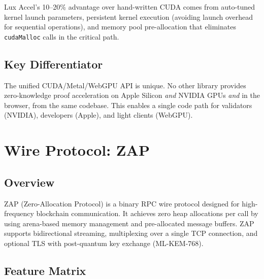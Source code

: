 \documentclass[11pt,twocolumn]{article}
\begin{document}
Lux Accel's 10--20\% advantage over hand-written CUDA comes from auto-tuned kernel launch parameters, persistent kernel execution (avoiding launch overhead for sequential operations), and memory pool pre-allocation that eliminates \texttt{cudaMalloc} calls in the critical path.

\subsection{Key Differentiator}

The unified CUDA/Metal/WebGPU API is unique. No other library provides zero-knowledge proof acceleration on Apple Silicon \textit{and} NVIDIA GPUs \textit{and} in the browser, from the same codebase. This enables a single code path for validators (NVIDIA), developers (Apple), and light clients (WebGPU).

\section{Wire Protocol: ZAP}
\label{sec:zap}

\subsection{Overview}

ZAP (Zero-Allocation Protocol) is a binary RPC wire protocol designed for high-frequency blockchain communication. It achieves zero heap allocations per call by using arena-based memory management and pre-allocated message buffers. ZAP supports bidirectional streaming, multiplexing over a single TCP connection, and optional TLS with post-quantum key exchange (ML-KEM-768).

\subsection{Feature Matrix}
\end{document}
